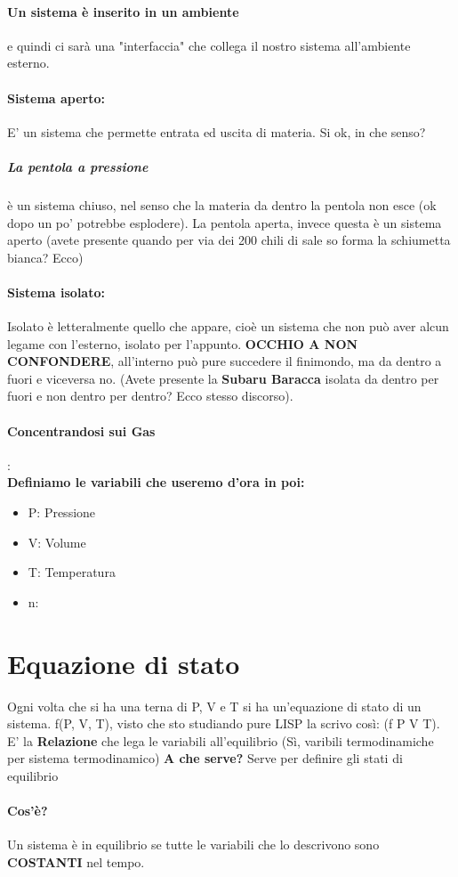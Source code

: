 \documentclass[12pt, a4paper, openany, oneside]{book}
\begin{document}
\paragraph{Un sistema è inserito in un ambiente} e quindi ci sarà una "interfaccia"
che collega il nostro sistema all'ambiente esterno.
\paragraph{Sistema aperto: }E' un sistema che permette entrata ed uscita di 
materia. Si ok, in che senso?
\subparagraph{La pentola a pressione} è un sistema chiuso, nel senso che la 
materia da dentro la pentola non esce (ok dopo un po' potrebbe esplodere). 
La pentola aperta, invece questa è un sistema aperto (avete presente quando 
per via dei 200 chili di sale so forma la schiumetta bianca? Ecco)
\paragraph{Sistema isolato: }Isolato è letteralmente quello che appare, cioè 
un sistema che non può aver alcun legame con l'esterno, isolato per l'appunto. 
\textbf{OCCHIO A NON CONFONDERE}, all'interno può pure succedere il finimondo, 
ma da dentro a fuori e viceversa
no. (Avete presente la \textbf{Subaru Baracca} isolata da dentro per fuori e non
dentro
per dentro? Ecco stesso discorso). 
\paragraph{Concentrandosi sui Gas}: \\
\textbf{Definiamo le variabili che useremo d'ora in poi:}
\begin{itemize}
	\item P: Pressione
	\item V: Volume
	\item T: Temperatura
	\item n:
\end{itemize}
\section{Equazione di stato}
Ogni volta che si ha una terna di P, V e T si ha un'equazione di stato di un 
sistema. f(P, V, T), visto che sto studiando pure LISP la scrivo così: (f P V T).
E' la \textbf{Relazione} che lega le variabili all'equilibrio (Sì, varibili 
termodinamiche per sistema termodinamico)
\textbf{A che serve?} Serve per definire gli stati di equilibrio
\paragraph{Cos'è?} Un sistema è in equilibrio se tutte le variabili che lo 
descrivono sono \textbf{COSTANTI} nel tempo. 
\end{document}
